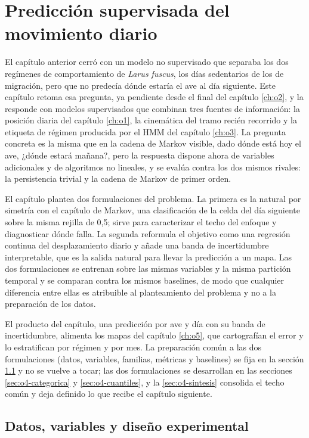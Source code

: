 \chapter{Predicción supervisada del movimiento diario}
\label{ch:o4}

El capítulo anterior cerró con un modelo no supervisado que separaba los dos regímenes
de comportamiento de \textit{Larus fuscus}, los días sedentarios de los de migración,
pero que no predecía dónde estaría el ave al día siguiente. Este capítulo retoma esa
pregunta, ya pendiente desde el final del capítulo \ref{ch:o2}, y la responde con
modelos supervisados que combinan tres fuentes de información: la posición diaria del
capítulo \ref{ch:o1}, la cinemática del tramo recién recorrido y la etiqueta de
régimen producida por el HMM del capítulo \ref{ch:o3}. La pregunta concreta es la
misma que en la cadena de Markov visible, dado dónde está hoy el ave, ¿dónde estará
mañana?, pero la respuesta dispone ahora de variables adicionales y de algoritmos no
lineales, y se evalúa contra los dos mismos rivales: la persistencia trivial y la
cadena de Markov de primer orden.

El capítulo plantea dos formulaciones del problema. La primera es la natural por
simetría con el capítulo de Markov, una clasificación de la celda del día siguiente
sobre la misma rejilla de 0,5\textdegree; sirve para caracterizar el techo del
enfoque y diagnosticar dónde falla. La segunda reformula el objetivo como una
regresión continua del desplazamiento diario y añade una banda de incertidumbre
interpretable, que es la salida natural para llevar la predicción a un mapa. Las dos
formulaciones se entrenan sobre las mismas variables y la misma partición temporal y
se comparan contra los mismos baselines, de modo que cualquier diferencia entre ellas
es atribuible al planteamiento del problema y no a la preparación de los datos.

El producto del capítulo, una predicción por ave y día con su banda de incertidumbre,
alimenta los mapas del capítulo \ref{ch:o5}, que cartografían el error y lo
estratifican por régimen y por mes. La preparación común a las dos formulaciones
(datos, variables, familias, métricas y baselines) se fija en la sección
\ref{sec:o4-diseno} y no se vuelve a tocar; las dos formulaciones se desarrollan en
las secciones \ref{sec:o4-categorica} y \ref{sec:o4-cuantiles}, y la
\ref{sec:o4-sintesis} consolida el techo común y deja definido lo que recibe el
capítulo siguiente.

\section{Datos, variables y diseño experimental}
\label{sec:o4-diseno}

